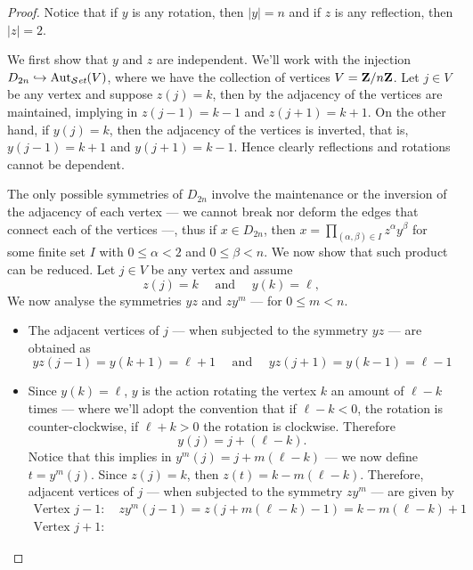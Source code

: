 \begin{proof}
  Notice that if \(y\) is any rotation, then \(|y| = n\) and if \(z\) is any
  reflection, then \(|z| = 2\).

  We first show that \(y\) and \(z\) are independent. We'll work with the
  injection \(D_{2n} \hookrightarrow \operatorname{Aut}_{\mathcal{S}\textit{et}}(V)\), where we have the collection of
  vertices \(V = \mathbf{Z}/n\mathbf{Z}\). Let \(j \in V\) be any vertex and suppose \(z(j) =
  k\), then by the adjacency of the vertices are maintained, implying in \(z(j -
  1) = k - 1\) and \(z(j + 1) = k + 1\). On the other hand, if \(y(j) = k\),
  then the adjacency of the vertices is inverted, that is, \(y(j - 1) = k + 1\)
  and \(y(j + 1) = k - 1\). Hence clearly reflections and rotations cannot be
  dependent.

  The only possible symmetries of \(D_{2n}\) involve the maintenance or the
  inversion of the adjacency of each vertex --- we cannot break nor deform the
  edges that connect each of the vertices ---, thus if \(x \in D_{2n}\), then
  \(x = \prod_{(\alpha, \beta) \in I} z^\alpha y^\beta\) for some finite set
  \(I\) with \(0 \leq \alpha < 2\) and \(0 \leq \beta < n\). We now show that such
  product can be reduced. Let \(j \in V\) be any vertex and assume
  \[
    z(j) = k
    \quad\text{ and }\quad
    y(k) = \ell,
  \]
  We now analyse the symmetries \(y z\) and \(z y^m\) --- for \(0 \leq m < n\).
  \begin{itemize}
    \item The adjacent vertices of \(j\) --- when subjected to the symmetry \(y
      z\) --- are obtained as
      \[
        y z(j - 1) = y(k + 1) = \ell + 1
        \quad\text{ and }\quad
        y z(j + 1) = y(k - 1) = \ell - 1
      \]
    \item Since \(y(k) = \ell\), \(y\) is the action rotating the vertex \(k\)
      an amount of \(\ell - k\) times  --- where we'll adopt the convention that
      if \(\ell - k < 0\), the rotation is counter-clockwise, if \(\ell + k >
      0\) the rotation is clockwise. Therefore
      \[
        y(j) = j + (\ell - k).
      \]
      Notice that this implies in \(y^m(j) = j + m(\ell - k)\) --- we now define
      \(t = y^m(j)\). Since \(z(j) = k\), then \(z(t) = k - m(\ell - k)\).
      Therefore, adjacent vertices of \(j\) --- when subjected to the symmetry
      \(z y^m\) --- are given by
      \begin{gather*}
        \text{Vertex } j - 1: \quad
        z y^m(j - 1) = z(j + m (\ell - k) - 1) = k - m(\ell - k) + 1 \\
        \text{Vertex } j + 1: \quad

\end{gather*}
\end{itemize}
\end{proof}
